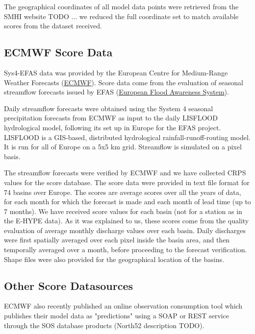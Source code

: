 \documentclass[logos,parttoc,morelanguage=french,morelanguage=italian]{orsay-memoire}
\begin{document}
The geographical coordinates of all model data points were retrieved from the SMHI website TODO ... we reduced the full coordinate set to match available scores from the dataset received.

\subsection{ECMWF Score Data}

\gls{Sys4-EFAS} data was provided by the European Centre for Medium-Range Weather Forecasts (\href{http://www.ecmwf.int}{ECMWF}). Score data come from the evaluation of seasonal streamflow forecasts issued by EFAS (\href{https://www.efas.eu/about-efas.html}{European Flood Awareness System}).

Daily streamflow forecasts were obtained using the System 4 seasonal precipitation forecasts from ECMWF as input to the daily LISFLOOD hydrological model, following its set up in Europe for the EFAS project. LISFLOOD is a GIS-based, distributed hydrological rainfall-runoff-routing model. It is run for all of Europe on a 5x5 km grid. Streamflow is simulated on a pixel basis.

The streamflow forecasts were verified by ECMWF and we have collected CRPS values for the score database. The score data were provided in text file format for 74 basins over Europe. The scores are average scores over all the years of data, for each month for which the forecast is made and each month of lead time (up to 7 months). We have received score values for each basin (not for a station as in the E-HYPE data).  As it was explained to us, these scores come from the quality evaluation of average monthly discharge values over each basin. Daily discharges were first spatially averaged over each pixel inside the basin area, and then temporally averaged over a month, before proceeding to the forecast verification. Shape files were also provided for the geographical location of the basins.

\subsection{Other Score Datasources}

ECMWF also recently published an online observation consumption tool which publishes their model data as "predictions" using a SOAP or REST service through the SOS database products (North52 description TODO). 



\end{document}
